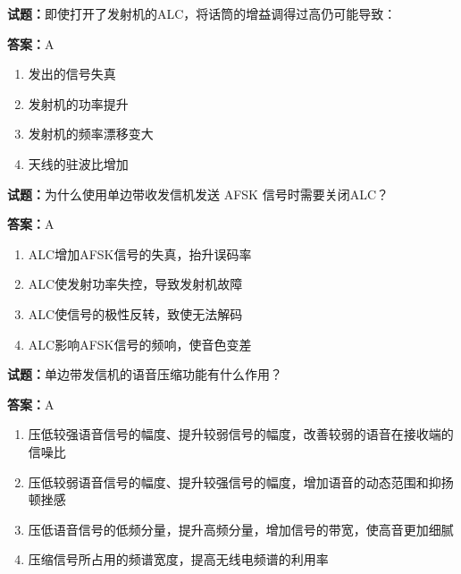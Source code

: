 \documentclass{ctexbook}
\begin{document}




\vspace{1em}

\textbf{试题：}即使打开了发射机的ALC，将话筒的增益调得过高仍可能导致： 

\textbf{答案：}A 

\begin{enumerate}[leftmargin=3em]
  \item 发出的信号失真 

  \item 发射机的功率提升 

  \item 发射机的频率漂移变大 

  \item 天线的驻波比增加 

\end{enumerate}





\vspace{1em}

\textbf{试题：}为什么使用单边带收发信机发送 AFSK 信号时需要关闭ALC？ 

\textbf{答案：}A 

\begin{enumerate}[leftmargin=3em]
  \item ALC增加AFSK信号的失真，抬升误码率 

  \item ALC使发射功率失控，导致发射机故障 

  \item ALC使信号的极性反转，致使无法解码 

  \item ALC影响AFSK信号的频响，使音色变差 

\end{enumerate}





\vspace{1em}

\textbf{试题：}单边带发信机的语音压缩功能有什么作用？ 

\textbf{答案：}A 

\begin{enumerate}[leftmargin=3em]
  \item 压低较强语音信号的幅度、提升较弱信号的幅度，改善较弱的语音在接收端的信噪比 

  \item 压低较弱语音信号的幅度、提升较强信号的幅度，增加语音的动态范围和抑扬顿挫感 

  \item 压低语音信号的低频分量，提升高频分量，增加信号的带宽，使高音更加细腻 

  \item 压缩信号所占用的频谱宽度，提高无线电频谱的利用率 

\end{enumerate}
\end{document}
